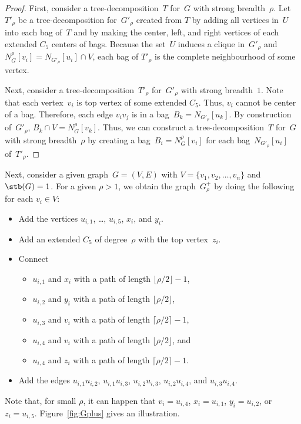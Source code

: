 \begin{proof}
First, consider a tree-decomposition~$T$ for~$G$ with strong breadth~$\rho$.
Let $T'_\rho$ be a tree-decomposition for~$G'_\rho$ created from $T$ by adding all vertices in~$U$ into each bag of~$T$ and by making the center, left, and right vertices of each extended $C_5$ centers of bags.
Because the set~$U$ induces a clique in~$G'_\rho$ and $N_G^\rho[v_i] = N_{G'_\rho}[u_i] \cap V$, each bag of $T'_\rho$ is the complete neighbourhood of some vertex.

Next, consider a tree-decomposition~$T'_\rho$ for~$G'_\rho$ with strong breadth~$1$.
Note that each vertex~$v_i$ is top vertex of some extended $C_5$.
Thus, $v_i$ cannot be center of a bag.
Therefore, each edge $v_iv_j$ is in a bag~$B_k = N_{G'_\rho}[u_k]$.
By construction of~$G'_\rho$, $B_k \cap V = N_G^\rho[v_k]$.
Thus, we can construct a tree-decomposition~$T$ for~$G$ with strong breadth~$\rho$ by creating a bag~$B_i = N_G^\rho[v_i]$ for each bag~$N_{G'_\rho}[u_i]$ of~$T'_\rho$.
\end{proof}


Next, consider a given graph~$G = (V, E)$ with $V = \{ v_1, v_2, \ldots, v_n \}$ and $\stb(G) = 1$.
For a given $\rho > 1$, we obtain the graph~$G_\rho^+$ by doing the following for each $v_i \in V$:
\begin{itemize}
    \item
        Add the vertices $u_{i,1}$, \ldots, $u_{i,5}$, $x_i$, and $y_i$.
    \item
        Add an extended $C_5$ of degree~$\rho$ with the top vertex~$z_i$.
    \item
        Connect
        \begin{itemize}
            \item
                $u_{i,1}$ and $x_i$ with a path of length $\lfloor \rho / 2 \rfloor - 1$,
            \item
                $u_{i,2}$ and $y_i$ with a path of length $\lfloor \rho / 2 \rfloor$,
            \item
                $u_{i,3}$ and $v_i$ with a path of length $\lceil \rho / 2 \rceil - 1$,
            \item
                $u_{i,4}$ and $v_i$ with a path of length $\lfloor \rho / 2 \rfloor$, and
            \item
                $u_{i,4}$ and $z_i$ with a path of length $\lceil \rho / 2 \rceil - 1$.
        \end{itemize}
    \item
        Add the edges $u_{i,1}u_{i,2}$, $u_{i,1}u_{i,3}$, $u_{i,2}u_{i,3}$, $u_{i,2}u_{i,4}$, and $u_{i,3}u_{i,4}$.
\end{itemize}
Note that, for small $\rho$, it can happen that $v_i = u_{i,4}$, $x_i = u_{i,1}$, $y_i = u_{i,2}$, or $z_i = u_{i,5}$.
Figure~\ref{fig:Gplus} gives an illustration.

